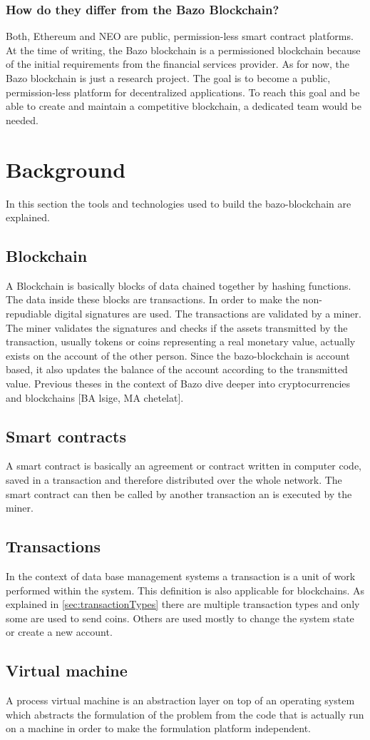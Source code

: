 \subsubsection{How do they differ from the Bazo Blockchain?}
Both, Ethereum and NEO are public, permission-less smart contract platforms. At the time of writing, the Bazo blockchain is a permissioned blockchain because of the initial requirements from the financial services provider. As for now, the Bazo blockchain is just a research project. The goal is to become a public, permission-less platform for decentralized applications. To reach this goal and be able to create and maintain a competitive blockchain, a dedicated team would be needed. 

\section{Background}
In this section the tools and technologies used to build the bazo-blockchain are explained.

\subsection{Blockchain}
A Blockchain is basically blocks of data chained together by hashing functions. The data inside these blocks are transactions. In order to make the non-repudiable digital signatures are used. The transactions are validated by a miner. The miner validates the signatures and checks if the assets transmitted by the transaction, usually tokens or coins representing a real monetary value, actually exists on the account of the other person. Since the bazo-blockchain is account based, it also updates the balance of the account according to the transmitted value. Previous theses in the context of Bazo dive deeper into cryptocurrencies and blockchains [BA lsige, MA chetelat].

\subsection{Smart contracts}
A smart contract is basically an agreement or contract written in computer code, saved in a transaction and therefore distributed over the whole network. The smart contract can then be called by another transaction an is executed by the miner. 

\subsection{Transactions}
In the context of data base management systems a transaction is a unit of work performed within the system. \cite{dbtransaction} This definition is also applicable for blockchains. As explained in \autoref{sec:transactionTypes}
there are multiple transaction types and only some are used to send coins. Others are used mostly to change the system state or create a new account.

\subsection{Virtual machine}
A process virtual machine is an abstraction layer on top of an operating system which abstracts the formulation of the problem from the code that is actually run on a machine in order to make the formulation platform independent.
